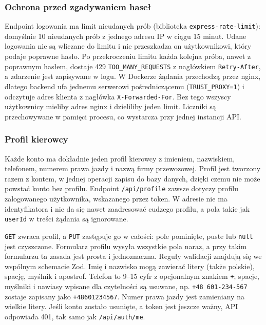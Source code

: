 \subsubsection{Ochrona przed zgadywaniem haseł}

Endpoint logowania ma limit nieudanych prób (biblioteka
\texttt{express-rate-limit}): domyślnie 10 nieudanych prób z jednego adresu IP
w ciągu 15 minut. Udane logowania nie są wliczane do limitu i nie przeszkadza
on użytkownikowi, który podaje poprawne hasło. Po przekroczeniu limitu każda
kolejna próba, nawet z poprawnym hasłem, dostaje 429
\texttt{TOO\_MANY\_REQUESTS} z nagłówkiem \texttt{Retry-After}, a zdarzenie jest
zapisywane w logu. W Dockerze żądania przechodzą przez nginx, dlatego backend
ufa jednemu serwerowi pośredniczącemu (\texttt{TRUST\_PROXY=1}) i odczytuje
adres klienta z nagłówka \texttt{X-Forwarded-For}. Bez tego wszyscy
użytkownicy mieliby adres nginx i dzieliliby jeden limit. Liczniki są
przechowywane w pamięci procesu, co wystarcza przy jednej instancji API.

\subsubsection{Profil kierowcy}

Każde konto ma dokładnie jeden profil kierowcy z imieniem, nazwiskiem,
telefonem, numerem prawa jazdy i nazwą firmy przewozowej. Profil jest tworzony
razem z kontem, w jednej operacji zapisu do bazy danych, dzięki czemu nie
może powstać konto bez profilu. Endpoint \texttt{/api/profile} zawsze dotyczy
profilu zalogowanego użytkownika, wskazanego przez token. W adresie nie ma
identyfikatora i nie da się nawet zaadresować cudzego profilu, a pola
takie jak \texttt{userId} w treści żądania są ignorowane.

\texttt{GET} zwraca profil, a \texttt{PUT} zastępuje go w całości: pole
pominięte, puste lub \texttt{null} jest czyszczone. Formularz profilu
wysyła wszystkie pola naraz, a przy takim formularzu ta zasada jest prosta
i jednoznaczna. Reguły
walidacji znajdują się we wspólnym schemacie Zod. Imię i nazwisko mogą
zawierać litery (także polskie), spację, myślnik i apostrof. Telefon to 9--15
cyfr z opcjonalnym znakiem \texttt{+}; spacje, myślniki i nawiasy wpisane dla
czytelności są usuwane, np. \texttt{+48 601-234-567} zostaje zapisany jako
\texttt{+48601234567}. Numer prawa jazdy jest zamieniany na wielkie litery.
Jeśli konto zostało usunięte, a token jest jeszcze ważny, API odpowiada 401,
tak samo jak \texttt{/api/auth/me}.

